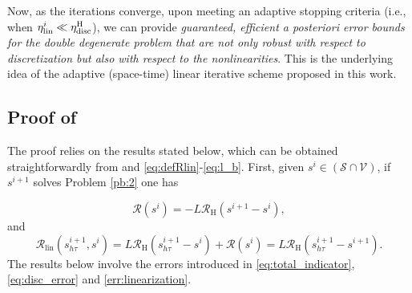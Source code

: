 \documentclass[review,11pt]{article}
\numberwithin{equation}{section}
\def \t  {\tau}
\def \calE {\mathcal{E}}
\def \calV {\mathcal{V}}
\def \calR {\mathcal{R}}
\def \resH {{\calR}_{\mathrm{H}}}
\def \calS {\mathcal{S}}
\newtheorem{proposition}[proposition]{Proposition}
\begin{document}
Now, as the iterations converge, upon meeting an adaptive stopping criteria (i.e., when $\eta_{\mathrm{lin}}^i\ll \eta_{\mathrm{disc}}^{\rm H}$), we can provide \emph{guaranteed, efficient a posteriori error bounds for the double degenerate problem that are not only robust with respect to discretization but also with respect to the nonlinearities}. This is the underlying idea of the adaptive (space-time) linear iterative scheme proposed in this work.

\subsection{Proof of }
The proof relies on the results stated below, which can be obtained straightforwardly from  and \eqref{eq:defRlin}-\eqref{eq:l_b}. First, given $s^i\in (\calS \cap \calV)$, if $s^{i+1}$ solves Problem \ref{pb:2} one has

\[
\calR(s^i) =-L\resH(s^{i+1}-s^i),
\]
and
\[
\calR_{\mathrm{lin}}(s^{i+1}_{h\t},s^i)= L\resH(s^{i+1}_{h\t}-s^i) + \calR(s^i)= L\resH(s^{i+1}_{h\t}- s^{i+1}).
\]
The results below involve the errors introduced in   \eqref{eq:total_indicator}, \eqref{eq:disc_error} and \eqref{err:linearization}.

\end{document}
